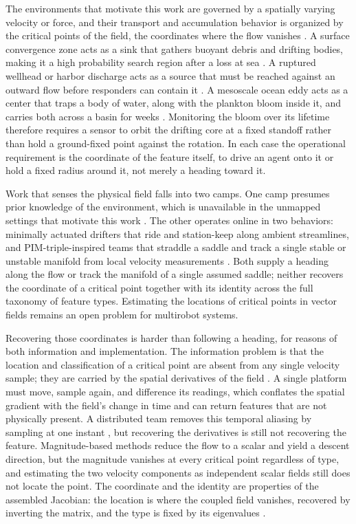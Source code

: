 \documentclass[lettersize,journal]{IEEEtran}
\begin{document}
The environments that motivate this work are governed by a spatially varying velocity or force, and their transport and accumulation behavior is organized by the critical points of the field, the coordinates where the flow vanishes \cite{32,36}. A surface convergence zone acts as a sink that gathers buoyant debris and drifting bodies, making it a high probability search region after a loss at sea \cite{37,38}. A ruptured wellhead or harbor discharge acts as a source that must be reached against an outward flow before responders can contain it \cite{40,41}. A mesoscale ocean eddy acts as a center that traps a body of water, along with the plankton bloom inside it, and carries both across a basin for weeks \cite{43,44,45}. Monitoring the bloom over its lifetime therefore requires a sensor to orbit the drifting core at a fixed standoff rather than hold a ground-fixed point against the rotation. In each case the operational requirement is the coordinate of the feature itself, to drive an agent onto it or hold a fixed radius around it, not merely a heading toward it.

Work that senses the physical field falls into two camps. One camp presumes prior knowledge of the environment, which is unavailable in the unmapped settings that motivate this work \cite{30,31}. The other operates online in two behaviors: minimally actuated drifters that ride and station-keep along ambient streamlines, and PIM-triple-inspired teams that straddle a saddle and track a single stable or unstable manifold from local velocity measurements \cite{23,32,33}. Both supply a heading along the flow or track the manifold of a single assumed saddle; neither recovers the coordinate of a critical point together with its identity across the full taxonomy of feature types. Estimating the locations of critical points in vector fields remains an open problem for multirobot systems.

Recovering those coordinates is harder than following a heading, for reasons of both information and implementation. The information problem is that the location and classification of a critical point are absent from any single velocity sample; they are carried by the spatial derivatives of the field \cite{46}. A single platform must move, sample again, and difference its readings, which conflates the spatial gradient with the field's change in time and can return features that are not physically present. A distributed team removes this temporal aliasing by sampling at one instant \cite{22,23,47}, but recovering the derivatives is still not recovering the feature. Magnitude-based methods \cite{48} reduce the flow to a scalar and yield a descent direction, but the magnitude vanishes at every critical point regardless of type, and estimating the two velocity components as independent scalar fields still does not locate the point. The coordinate and the identity are properties of the assembled Jacobian: the location is where the coupled field vanishes, recovered by inverting the matrix, and the type is fixed by its eigenvalues \cite{36}.
\end{document}

